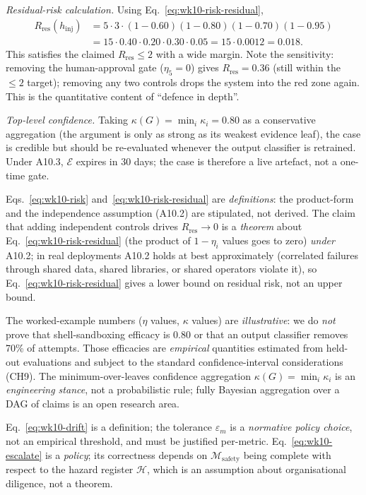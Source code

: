 \begin{workedexample}
\emph{Residual-risk calculation.} Using
Eq.~\eqref{eq:wk10-risk-residual},
\begin{align*}
  R_\mathrm{res}(h_\mathrm{inj})
  &= 5 \cdot 3 \cdot
     (1-0.60)(1-0.80)(1-0.70)(1-0.95) \\
  &= 15 \cdot 0.40 \cdot 0.20 \cdot 0.30 \cdot 0.05
   = 15 \cdot 0.0012
   = 0.018.
\end{align*}
This satisfies the claimed $R_\mathrm{res} \le 2$ with a wide
margin. Note the sensitivity: removing the human-approval
gate ($\eta_5 = 0$) gives $R_\mathrm{res} = 0.36$ (still within
the $\le 2$ target); removing any two controls drops the system
into the red zone again. This is the quantitative content of
``defence in depth''.

\emph{Top-level confidence.} Taking
$\kappa(G) = \min_i \kappa_i = 0.80$ as a conservative aggregation
(the argument is only as strong as its weakest evidence leaf),
the case is credible but should be re-evaluated whenever the
output classifier is retrained. Under A10.3, $\mathcal{E}$ expires in
30 days; the case is therefore a live artefact, not a one-time
gate.
\end{workedexample}

\begin{provedassumed}
Eqs.~\eqref{eq:wk10-risk} and~\eqref{eq:wk10-risk-residual} are
\emph{definitions}: the product-form and the independence
assumption (A10.2) are stipulated, not derived. The claim that
adding independent controls drives $R_\mathrm{res} \to 0$ is a
\emph{theorem} about Eq.~\eqref{eq:wk10-risk-residual} (the
product of $1 - \eta_i$ values goes to zero) \emph{under} A10.2;
in real deployments A10.2 holds at best approximately (correlated
failures through shared data, shared libraries, or shared
operators violate it), so Eq.~\eqref{eq:wk10-risk-residual} gives
a lower bound on residual risk, not an upper bound.

The worked-example numbers ($\eta$ values, $\kappa$ values) are
\emph{illustrative}: we do \emph{not} prove that shell-sandboxing
efficacy is 0.80 or that an output classifier removes 70\% of
attempts. Those efficacies are \emph{empirical} quantities
estimated from held-out evaluations and subject to the standard
confidence-interval considerations (CH9). The
minimum-over-leaves confidence aggregation $\kappa(G) = \min_i
\kappa_i$ is an \emph{engineering stance}, not a probabilistic
rule; fully Bayesian aggregation over a DAG of claims is an open
research area.

Eq.~\eqref{eq:wk10-drift} is a definition; the tolerance
$\varepsilon_m$ is a \emph{normative policy choice}, not an
empirical threshold, and must be justified per-metric.
Eq.~\eqref{eq:wk10-escalate} is a \emph{policy}; its correctness
depends on $\mathcal{M}_\mathrm{safety}$ being complete with respect
to the hazard register $\mathcal{H}$, which is an assumption about
organisational diligence, not a theorem.
\end{provedassumed}

